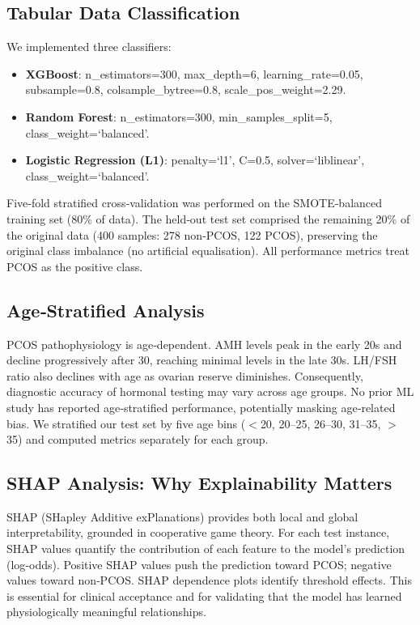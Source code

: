 \documentclass[conference]{IEEEtran}
\begin{document}
\subsection{Tabular Data Classification}

We implemented three classifiers:

\begin{itemize}
\item \textbf{XGBoost}: n\_estimators=300, max\_depth=6, learning\_rate=0.05, subsample=0.8, colsample\_bytree=0.8, scale\_pos\_weight=2.29.
\item \textbf{Random Forest}: n\_estimators=300, min\_samples\_split=5, class\_weight=`balanced'.
\item \textbf{Logistic Regression (L1)}: penalty=`l1', C=0.5, solver=`liblinear', class\_weight=`balanced'.
\end{itemize}

Five‑fold stratified cross‑validation was performed on the SMOTE‑balanced training set (80\% of data). The held‑out test set comprised the remaining 20\% of the original data (400 samples: 278 non‑PCOS, 122 PCOS), preserving the original class imbalance (no artificial equalisation). All performance metrics treat PCOS as the positive class.

\subsection{Age‑Stratified Analysis}

PCOS pathophysiology is age‑dependent. AMH levels peak in the early 20s and decline progressively after 30, reaching minimal levels in the late 30s. LH/FSH ratio also declines with age as ovarian reserve diminishes. Consequently, diagnostic accuracy of hormonal testing may vary across age groups. No prior ML study has reported age‑stratified performance, potentially masking age‑related bias. We stratified our test set by five age bins ($<$20, 20–25, 26–30, 31–35, $>$35) and computed metrics separately for each group.

\subsection{SHAP Analysis: Why Explainability Matters}

SHAP (SHapley Additive exPlanations) provides both local and global interpretability, grounded in cooperative game theory. For each test instance, SHAP values quantify the contribution of each feature to the model’s prediction (log‑odds). Positive SHAP values push the prediction toward PCOS; negative values toward non‑PCOS. SHAP dependence plots identify threshold effects. This is essential for clinical acceptance and for validating that the model has learned physiologically meaningful relationships.
\end{document}
